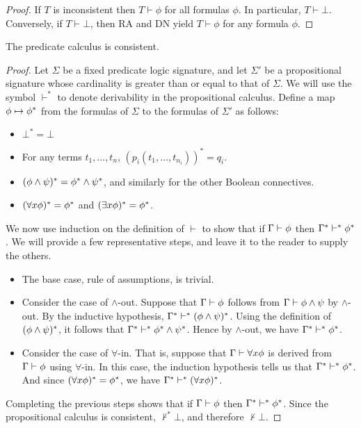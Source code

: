 \begin{proof} If $T$ is inconsistent then $T\vdash\phi$ for all
  formulas $\phi$.  In particular, $T\vdash \bot$.  Conversely, if
  $T\vdash\bot$, then RA and DN yield $T\vdash\phi$ for any formula
  $\phi$. \end{proof}


\begin{thm} The predicate calculus is consistent. \end{thm}

\begin{proof} Let $\Sigma$ be a fixed predicate logic signature, and
  let $\Sigma '$ be a propositional signature whose cardinality is
  greater than or equal to that of $\Sigma$.  We will use the symbol
  $\vdash ^*$ to denote derivability in the propositional calculus.
  Define a map $\phi\mapsto\phi ^*$ from the formulas of $\Sigma$ to the
  formulas of $\Sigma '$ as follows:
\begin{itemize}
\item $\bot ^*=\bot$
\item For any terms $t_1,\dots ,t_n$,
  $(p_i(t_1,\dots ,t_{n_i}))^*=q_i$.
\item $(\phi\wedge\psi )^*=\phi ^*\wedge \psi ^*$, and similarly for the
  other Boolean connectives.
\item $(\forall x\phi )^*=\phi ^*$ and $(\exists x\phi )^*=\phi ^*$.
\end{itemize}
We now use induction on the definition of $\vdash$ to show that if
$\Gamma\vdash\phi$ then $\Gamma ^*\vdash ^*\phi ^*$.  We will provide a
few representative steps, and leave it to the reader to supply the
others.

\begin{itemize}
\item The base case, rule of assumptions, is trivial.
\item Consider the case of $\wedge$-out.  Suppose that
  $\Gamma\vdash\phi$ follows from $\Gamma\vdash\phi\wedge\psi$ by
  $\wedge$-out.  By the inductive hypothesis,
  $\Gamma ^*\vdash ^*(\phi\wedge\psi )^*$.  Using the definition of
  $(\phi\wedge\psi )^*$, it follows that
  $\Gamma ^*\vdash ^*\phi ^*\wedge \psi ^*$.  Hence by $\wedge$-out, we
  have $\Gamma ^*\vdash ^* \phi ^*$.
\item Consider the case of $\forall$-in.  That is, suppose that
  $\Gamma\vdash\forall x\phi$ is derived from $\Gamma\vdash\phi$ using
  $\forall$-in.  In this case, the induction hypothesis tells us that
  $\Gamma ^*\vdash ^*\phi ^*$.  And since $(\forall x\phi )^*=\phi ^*$,
  we have $\Gamma ^*\vdash ^*(\forall x\phi )^*$.
\end{itemize}
Completing the previous steps shows that if $\Gamma\vdash\phi$ then
$\Gamma ^*\vdash ^*\phi ^*$.  Since the propositional calculus is
consistent, $\not\vdash ^*\bot$, and therefore
$\not\vdash\bot$. \end{proof}

